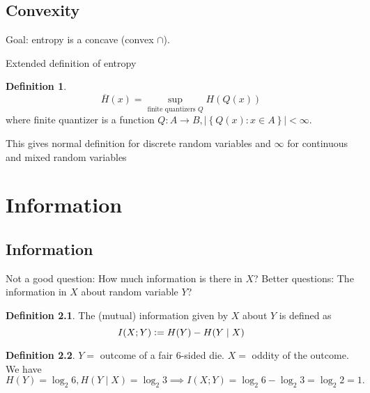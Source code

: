 \documentclass{report}
\newcommand{\set}[1]{\left\lbrace #1 \right\rbrace}
\newcommand{\defeq}{\vcentcolon=}
\theoremstyle{definition}
\newtheorem{definition}{Definition}[section]
\theoremstyle{remark}
\numberwithin{equation}{section}
\begin{document}
\section{Convexity}
Goal: entropy is a concave (convex $\cap$).

Extended definition of entropy 
\begin{definition}
  \[\overline{H}(x) = \sup_{\text{finite quantizers $Q$}} H(Q(x)) \] where finite quantizer is a function $Q: A \to B, |\set{Q(x): x \in A}| < \infty$.
\end{definition}
This gives normal definition for discrete random variables and $\infty$ for continuous and mixed random variables

\chapter{Information}

\section{Information}
Not a good question: How much information is there in $X$?
Better questions: The information in $X$ about random variable $Y$?

\begin{definition}
  The (mutual) information given by $X$ about $Y$ is defined as
  \[I(X; Y) \defeq H(Y) - H(Y \mid X)\]
\end{definition}
\begin{definition}
  $Y =$ outcome of a fair $6$-sided die. $X = $ oddity of the outcome. We have \[
  H(Y) = \log_2 6, H(Y \mid X) = \log_2 3 \implies I(X; Y) = \log_2 6 - \log_2 3 = \log_2 2 = 1.  
  \]
\end{definition}
\end{document}
